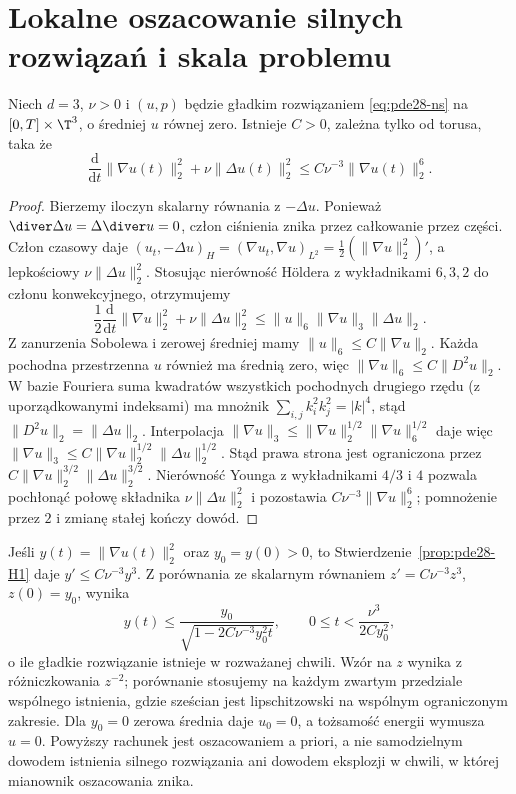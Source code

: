 \section{Lokalne oszacowanie silnych rozwiązań i skala problemu}
\begin{stwierdzenie}
\label{prop:pde28-H1}
Niech $d=3$, $\nu>0$ i $(u,p)$ będzie gładkim rozwiązaniem
\eqref{eq:pde28-ns} na $[0,T]\times\T^3$, o średniej $u$ równej zero.
Istnieje $C>0$, zależna tylko od torusa, taka że
\[
 \frac{\mathrm d}{\mathrm dt}\|\nabla u(t)\|_2^2
 +\nu\|\Delta u(t)\|_2^2
 \le C\nu^{-3}\|\nabla u(t)\|_2^6.
\]
\end{stwierdzenie}
\begin{proof}
Bierzemy iloczyn skalarny równania z $-\Delta u$.
Ponieważ $\diver\Delta u=\Delta\diver u=0$,
człon ciśnienia znika przez całkowanie przez części.
Człon czasowy daje
$(u_t,-\Delta u)_H=(\nabla u_t,\nabla u)_{L^2}
=\frac12(\|\nabla u\|_2^2)'$, a lepkościowy
$\nu\|\Delta u\|_2^2$. Stosując nierówność Höldera
z wykładnikami $6,3,2$ do członu konwekcyjnego,
otrzymujemy
\[
 \frac12\frac{\mathrm d}{\mathrm dt}\|\nabla u\|_2^2
 +\nu\|\Delta u\|_2^2
 \le\|u\|_6\|\nabla u\|_3\|\Delta u\|_2.
\]
Z zanurzenia Sobolewa i zerowej średniej mamy
$\|u\|_6\le C\|\nabla u\|_2$.
Każda pochodna przestrzenna $u$ również ma
średnią zero, więc $\|\nabla u\|_6\le C\|D^2u\|_2$.
W bazie Fouriera suma kwadratów wszystkich
pochodnych drugiego rzędu (z uporządkowanymi
indeksami) ma mnożnik
$\sum_{i,j}k_i^2 k_j^2=|k|^4$, stąd
$\|D^2u\|_2=\|\Delta u\|_2$.
Interpolacja $\|\nabla u\|_3\le
\|\nabla u\|_2^{1/2}\|\nabla u\|_6^{1/2}$
daje więc
$\|\nabla u\|_3\le C\|\nabla u\|_2^{1/2}
\|\Delta u\|_2^{1/2}$.
Stąd prawa strona jest ograniczona przez
$C\|\nabla u\|_2^{3/2}\|\Delta u\|_2^{3/2}$.
Nierówność Younga z wykładnikami $4/3$ i $4$
pozwala pochłonąć połowę składnika
$\nu\|\Delta u\|_2^2$ i pozostawia
$C\nu^{-3}\|\nabla u\|_2^6$; pomnożenie przez $2$
i zmianę stałej kończy dowód.
\end{proof}

\begin{uwaga}
Jeśli $y(t)=\|\nabla u(t)\|_2^2$ oraz $y_0=y(0)>0$,
to Stwierdzenie~\ref{prop:pde28-H1} daje
$y'\le C\nu^{-3}y^3$. Z porównania ze skalarnym
równaniem $z'=C\nu^{-3}z^3$, $z(0)=y_0$,
wynika
\[
 y(t)\le
 \frac{y_0}{\sqrt{1-2C\nu^{-3}y_0^2t}},
 \qquad 0\le t<\frac{\nu^3}{2Cy_0^2},
\]
o ile gładkie rozwiązanie istnieje w rozważanej chwili.
Wzór na $z$ wynika z różniczkowania $z^{-2}$;
porównanie stosujemy na każdym zwartym przedziale
wspólnego istnienia, gdzie sześcian jest lipschitzowski
na wspólnym ograniczonym zakresie.
Dla $y_0=0$ zerowa średnia daje $u_0=0$,
a tożsamość energii wymusza $u=0$.
Powyższy rachunek jest oszacowaniem a priori,
a nie samodzielnym dowodem istnienia silnego
rozwiązania ani dowodem eksplozji w chwili,
w której mianownik oszacowania znika.
\end{uwaga}


